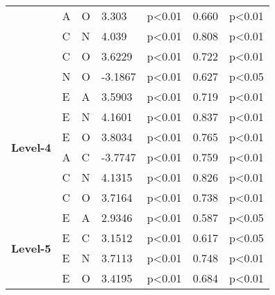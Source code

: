 \begin{longtable}{ |p{1.3cm}| p{0.5cm}|p{0.5cm}|p{1.2cm}| p{1.7cm}|p{1cm}|p{1.5cm}|  }
    &A		&O			&3.303			&p<0.01			& 0.660		&p<0.01\\
    &C		&N			&4.039			&p<0.01			& 0.808		&p<0.01\\
    &C		&O			&3.6229			&p<0.01			& 0.722		&p<0.01\\
    &N		&O			&-3.1867			&p<0.01			&0.627 		&p<0.05\\
    \hline
    \hline
    \multirow{6}{*}{\textbf{Level-4}}
    &E		&A			&3.5903			&p<0.01			&0.719 		&p<0.01\\
    &E		&N			&4.1601			&p<0.01			&0.837 		&p<0.01\\
    &E		&O			&3.8034			&p<0.01			&0.765		&p<0.01\\
    &A		&C			&-3.7747			&p<0.01			&0.759 		&p<0.01\\
    &C		&N			&4.1315			&p<0.01			&0.826 		&p<0.01\\
    &C		&O			&3.7164			&p<0.01			&0.738 		&p<0.01\\
    \hline
    \hline
    \multirow{4}{*}{\textbf{Level-5}}
    &E		&A			&2.9346			&p<0.01			&0.587 		&p<0.05\\
    &E		&C			&3.1512			&p<0.01			&0.617 		&p<0.05\\
    &E		&N			&3.7113			&p<0.01			&0.748 		&p<0.01\\
    &E		&O			&3.4195			&p<0.01			&0.684 		&p<0.01\\
    \hline
\end{longtable}

